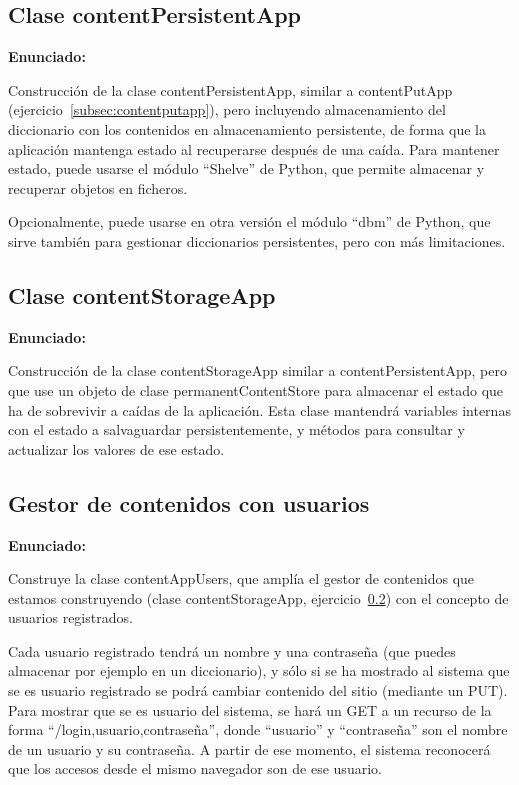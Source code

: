 \subsection{Clase contentPersistentApp}
\label{subsec:contentpersistentapp}

\textbf{Enunciado:}

Construcción de la clase contentPersistentApp, similar a contentPutApp (ejercicio~\ref{subsec:contentputapp}), pero incluyendo almacenamiento del diccionario con los contenidos en almacenamiento persistente, de forma que la aplicación mantenga estado al recuperarse después de una caída. Para mantener estado, puede usarse el módulo ``Shelve'' de Python, que permite almacenar y recuperar objetos en ficheros.

Opcionalmente, puede usarse en otra versión el módulo ``dbm'' de Python, que sirve también para gestionar diccionarios persistentes, pero con más limitaciones.

\subsection{Clase contentStorageApp}
\label{subsec:contentstorageapp}

\textbf{Enunciado:}

Construcción de la clase contentStorageApp similar a contentPersistentApp, pero que use un objeto de clase permanentContentStore para almacenar el estado que ha de sobrevivir a caídas de la aplicación. Esta clase mantendrá variables internas con el estado a salvaguardar persistentemente, y métodos para consultar y actualizar los valores de ese estado.

\subsection{Gestor de contenidos con usuarios}
\label{subsec:contentappusers}

\textbf{Enunciado:}

Construye la clase contentAppUsers, que amplía el gestor de contenidos que estamos construyendo (clase contentStorageApp, ejercicio~\ref{subsec:contentstorageapp}) con el concepto de usuarios registrados.

Cada usuario registrado tendrá un nombre y una contraseña (que puedes almacenar por ejemplo en un diccionario), y sólo si se ha mostrado al sistema que se es usuario registrado se podrá cambiar contenido del sitio (mediante un PUT). Para mostrar que se es usuario del sistema, se hará un GET a un recurso de la forma ``/login,usuario,contraseña'', donde ``usuario'' y ``contraseña'' son el nombre de un usuario y su contraseña. A partir de ese momento, el sistema reconocerá que los accesos desde el mismo navegador son de ese usuario. 

